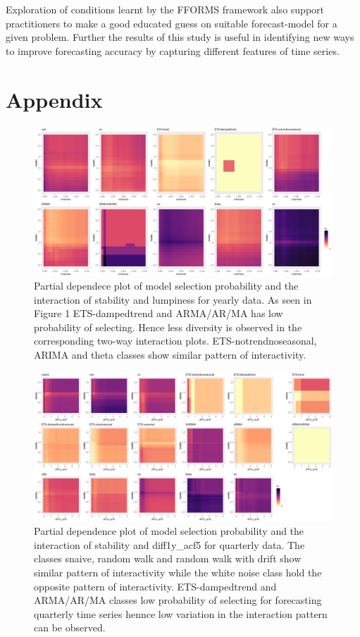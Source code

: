 \documentclass[11pt,a4paper,]{article}
\begin{document}
Exploration of conditions learnt by the FFORMS framework also support
practitioners to make a good educated guess on suitable forecast-model
for a given problem. Further the results of this study is useful in
identifying new ways to improve forecasting accuracy by capturing
different features of time series.

\newpage

\section*{Appendix}\label{appendix}

\begin{figure}
\centering
\includegraphics{figures/ytwopdp-1.png}
\caption{\label{fig:ytwopdp}Partial dependece plot of model selection
probability and the interaction of stability and lumpiness for yearly
data. As seen in Figure 1 ETS-dampedtrend and ARMA/AR/MA has low
probability of selecting. Hence less diversity is observed in the
corresponding two-way interaction plots. ETS-notrendnoseasonal, ARIMA
and theta classes show similar pattern of interactivity.}
\end{figure}

\begin{figure}
\centering
\includegraphics{figures/qtwopdp-1.png}
\caption{\label{fig:qtwopdp}Partial dependence plot of model selection
probability and the interaction of stability and diff1y\_acf5 for
quarterly data. The classes snaive, random walk and random walk with
drift show similar pattern of interactivity while the white noise class
hold the opposite pattern of interactivity. ETS-dampedtrend and
ARMA/AR/MA classes low probability of selecting for forecasting
quarterly time series hennce low variation in the interaction pattern
can be observed.}
\end{figure}
\end{document}
